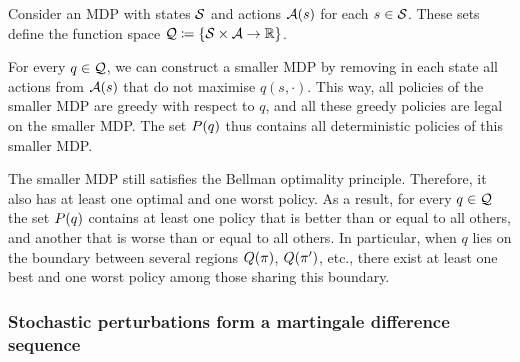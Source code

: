 



\begin{remark}
\label{rmk: boundary and optimal policy}

    Consider an MDP with states $\mathcal{S}$ and actions $\mathcal{A}(s)$ for each $s \in \mathcal{S}$. These sets define the function space $\mathcal{Q} \coloneqq \{ \mathcal{S} \times \mathcal{A} \to \mathbb{R} \}$.
    
    For every $q \in \mathcal{Q}$, we can construct a smaller MDP by removing in each state all actions from $\mathcal{A}(s)$ that do not maximise $q(s,\cdot)$.
    This way, all policies of the smaller MDP are greedy with respect to $q$,
    and all these greedy policies are legal on the smaller MDP.
    The set $P(q)$ thus contains all deterministic policies of this smaller MDP.
    
    The smaller MDP still satisfies the Bellman optimality principle. Therefore, it also has at least one optimal and one worst policy.
    As a result, for every $q \in \mathcal{Q}$ the set $P(q)$ contains at least one policy that is better than or equal to all others, and another that is worse than or equal to all others.
    In particular, when $q$ lies on the boundary between several regions $Q(\pi)$, $Q(\pi')$, etc., there exist at least one best and one worst policy among those sharing this boundary.
\end{remark}




\subsubsection{Stochastic perturbations form a martingale difference sequence}

